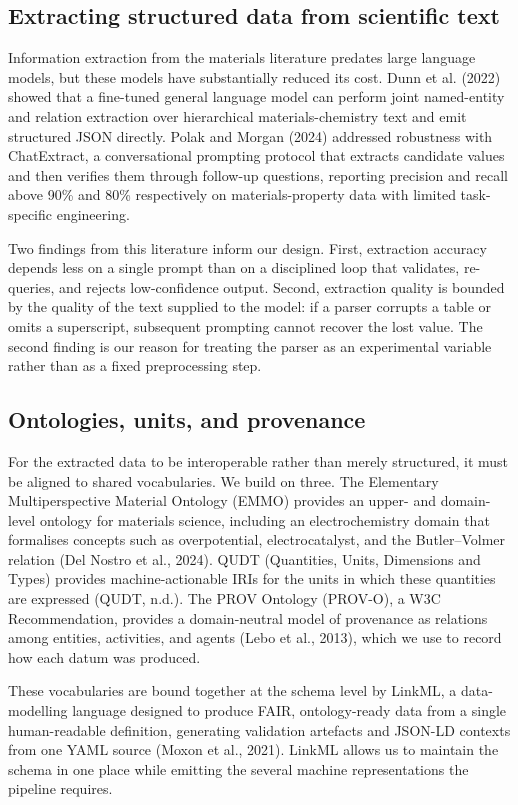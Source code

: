 \documentclass{template}
\begin{document}
\subsection{Extracting structured data from scientific text}

Information extraction from the materials literature predates large language models, but these models have substantially reduced its cost. Dunn et al. (2022) showed that a fine-tuned general language model can perform joint named-entity and relation extraction over hierarchical materials-chemistry text and emit structured JSON directly. Polak and Morgan (2024) addressed robustness with ChatExtract, a conversational prompting protocol that extracts candidate values and then verifies them through follow-up questions, reporting precision and recall above 90\% and 80\% respectively on materials-property data with limited task-specific engineering.

Two findings from this literature inform our design. First, extraction accuracy depends less on a single prompt than on a disciplined loop that validates, re-queries, and rejects low-confidence output. Second, extraction quality is bounded by the quality of the text supplied to the model: if a parser corrupts a table or omits a superscript, subsequent prompting cannot recover the lost value. The second finding is our reason for treating the parser as an experimental variable rather than as a fixed preprocessing step.

\subsection{Ontologies, units, and provenance}

For the extracted data to be interoperable rather than merely structured, it must be aligned to shared vocabularies. We build on three. The Elementary Multiperspective Material Ontology (EMMO) provides an upper- and domain-level ontology for materials science, including an electrochemistry domain that formalises concepts such as overpotential, electrocatalyst, and the Butler--Volmer relation (Del Nostro et al., 2024). QUDT (Quantities, Units, Dimensions and Types) provides machine-actionable IRIs for the units in which these quantities are expressed (QUDT, n.d.). The PROV Ontology (PROV-O), a W3C Recommendation, provides a domain-neutral model of provenance as relations among entities, activities, and agents (Lebo et al., 2013), which we use to record how each datum was produced.

These vocabularies are bound together at the schema level by LinkML, a data-modelling language designed to produce FAIR, ontology-ready data from a single human-readable definition, generating validation artefacts and JSON-LD contexts from one YAML source (Moxon et al., 2021). LinkML allows us to maintain the schema in one place while emitting the several machine representations the pipeline requires.
\end{document}
